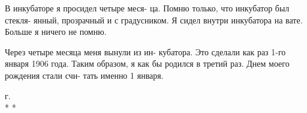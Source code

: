    В  инкубаторе я  просидел четыре  меся-
ца. Помню только, что инкубатор  был стекля-
янный,  прозрачный и с градусником.  Я сидел
внутри  инкубатора на вате.  Больше я ничего
не помню.

    Через четыре  месяца меня вынули из ин-
кубатора.  Это сделали  как раз  1-го января
1906 года. Таким образом, я как бы родился в
третий раз.  Днем  моего рождения стали счи-
тать именно 1 января.

 г.\\

\centering * * *